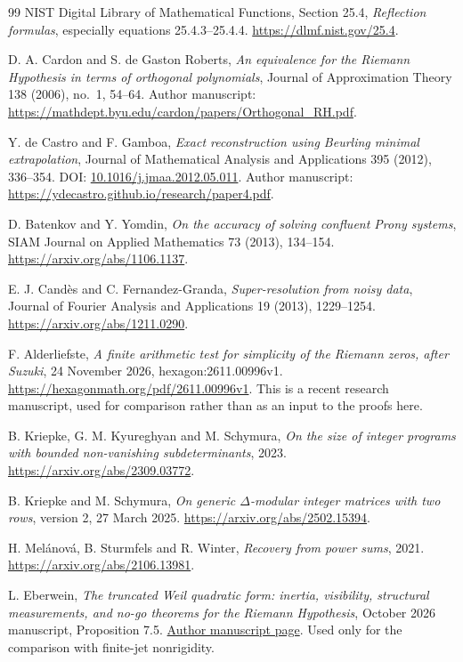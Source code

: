 \begin{thebibliography}{99}
NIST Digital Library of Mathematical Functions, Section 25.4,
\emph{Reflection formulas}, especially equations 25.4.3--25.4.4.
\url{https://dlmf.nist.gov/25.4}.

D. A. Cardon and S. de Gaston Roberts,
\emph{An equivalence for the Riemann Hypothesis in terms of orthogonal
polynomials}, Journal of Approximation Theory 138 (2006), no.~1, 54--64.
Author manuscript:
\url{https://mathdept.byu.edu/cardon/papers/Orthogonal_RH.pdf}.

Y. de Castro and F. Gamboa,
\emph{Exact reconstruction using Beurling minimal extrapolation},
Journal of Mathematical Analysis and Applications 395 (2012), 336--354.
DOI: \href{https://doi.org/10.1016/j.jmaa.2012.05.011}{10.1016/j.jmaa.2012.05.011}.
Author manuscript:
\url{https://ydecastro.github.io/research/paper4.pdf}.

D. Batenkov and Y. Yomdin,
\emph{On the accuracy of solving confluent Prony systems},
SIAM Journal on Applied Mathematics 73 (2013), 134--154.
\url{https://arxiv.org/abs/1106.1137}.

E. J. Cand\`es and C. Fernandez-Granda,
\emph{Super-resolution from noisy data},
Journal of Fourier Analysis and Applications 19 (2013), 1229--1254.
\url{https://arxiv.org/abs/1211.0290}.

F. Alderliefste,
\emph{A finite arithmetic test for simplicity of the Riemann zeros,
after Suzuki}, 24 November 2026, hexagon:2611.00996v1.
\url{https://hexagonmath.org/pdf/2611.00996v1}.
This is a recent research manuscript, used for comparison rather than as
an input to the proofs here.

B. Kriepke, G. M. Kyureghyan and M. Schymura,
\emph{On the size of integer programs with bounded non-vanishing
subdeterminants}, 2023.
\url{https://arxiv.org/abs/2309.03772}.

B. Kriepke and M. Schymura,
\emph{On generic $\Delta$-modular integer matrices with two rows},
version 2, 27 March 2025.
\url{https://arxiv.org/abs/2502.15394}.

H. Mel\'anov\'a, B. Sturmfels and R. Winter,
\emph{Recovery from power sums}, 2021.
\url{https://arxiv.org/abs/2106.13981}.

L. Eberwein,
\emph{The truncated Weil quadratic form: inertia, visibility,
structural measurements, and no-go theorems for the Riemann Hypothesis},
October 2026 manuscript, Proposition 7.5.
\href{https://www.academia.edu/178025276/The_truncated_Weil_quadratic_form_inertia_visibility_structural_measurements_and_no_go_theorems_for_the_Riemann_Hypothesis}{Author manuscript page}.
Used only for the comparison with finite-jet nonrigidity.
\end{thebibliography}
